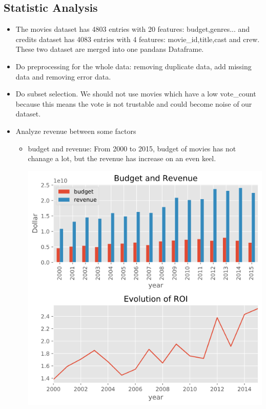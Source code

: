 \documentclass[UTF8]{article}
\begin{document}
\subsection{Statistic Analysis}
\begin{itemize}
    \item The movies dataset has 4803 entries with 20 features: budget,genres...
          and credits dataset has 4083 entries with 4 features: movie\_id,title,cast and crew.
          These two dataset are merged into one pandans Dataframe.
    \item Do preprocessing for the whole data: removing duplicate data, add missing data and removing error data.
    \item Do subset selection. We should not use movies which have a low vote\_count because
          this means the vote is not trustable and could become noise of our dataset.
    \item Analyze revenue between some factors
          \begin{itemize}
              \item budget and revenue: From 2000 to 2015, budget of movies has not chanage a lot, but the revenue has increase on an even keel.
                    \begin{center}
                        \includegraphics[scale=0.5]{Img/budget.png}

\end{center}
\end{itemize}
\end{itemize}
\end{document}
